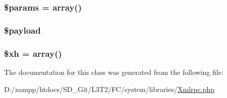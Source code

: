 \subsubsection[{\$params}]{\setlength{\rightskip}{0pt plus 5cm}\$params = array()}\label{class_x_m_l___r_p_c___message_afe68e6fbe7acfbffc0af0c84a1996466}
\hypertarget{class_x_m_l___r_p_c___message_ab6c08f2335783abfa1bce5d22fb3466e}{}
\subsubsection[{\$payload}]{\setlength{\rightskip}{0pt plus 5cm}\$payload}\label{class_x_m_l___r_p_c___message_ab6c08f2335783abfa1bce5d22fb3466e}
\hypertarget{class_x_m_l___r_p_c___message_aad3b174789357e147f0daa5b69930ac8}{}
\subsubsection[{\$xh}]{\setlength{\rightskip}{0pt plus 5cm}\$xh = array()}\label{class_x_m_l___r_p_c___message_aad3b174789357e147f0daa5b69930ac8}


The documentation for this class was generated from the following file\+:\begin{DoxyCompactItemize}
\item 
D\+:/xampp/htdocs/\+S\+D\+\_\+\+Git/\+L3\+T2/\+F\+C/system/libraries/\hyperlink{_xmlrpc_8php}{Xmlrpc.\+php}\end{DoxyCompactItemize}
